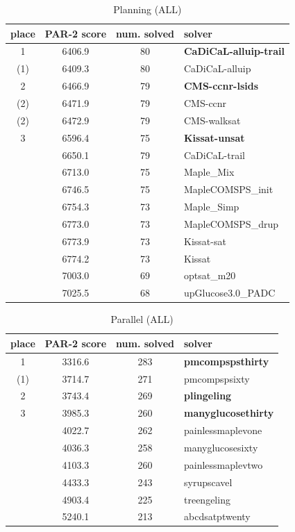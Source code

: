 \documentclass{elsarticle}
\begin{document}
\begin{table}
\caption{Planning (ALL)}
\label{tab:planning}
\begin{tabular}{cccl}
place & PAR-2 score & num. solved & solver \\
\hline   
 1    & 6406.9 & 80 & {\bf CaDiCaL-alluip-trail} \\
(1)   & 6409.3 & 80 & CaDiCaL-alluip \\
 2    & 6466.9 & 79 & {\bf CMS-ccnr-lsids} \\
(2)   & 6471.9 & 79 & CMS-ccnr \\
(2)   & 6472.9 & 79 & CMS-walksat \\
 3    & 6596.4 & 75 & {\bf Kissat-unsat} \\
      & 6650.1 & 79 & CaDiCaL-trail \\
      & 6713.0 & 75 & Maple\_Mix \\
      & 6746.5 & 75 & MapleCOMSPS\_init \\
      & 6754.3 & 73 & Maple\_Simp \\
      & 6773.0 & 73 & MapleCOMSPS\_drup \\
      & 6773.9 & 73 & Kissat-sat \\
      & 6774.2 & 73 & Kissat \\
      & 7003.0 & 69 & optsat\_m20 \\
      & 7025.5 & 68 & upGlucose3.0\_PADC \\
\end{tabular}
\end{table}


\begin{table}
\caption{Parallel (ALL)}
\label{tab:parallelALL}
\begin{tabular}{cccl}
place & PAR-2 score & num. solved & solver \\
\hline
 1 & 3316.6 & 283 & {\bf pmcompspsthirty} \\
(1)& 3714.7 & 271 & pmcompspsixty \\
 2 & 3743.4 & 269 & {\bf plingeling} \\
 3 & 3985.3 & 260 & {\bf manyglucosethirty} \\
   & 4022.7 & 262 & painlessmaplevone \\
   & 4036.3 & 258 & manyglucosesixty \\
   & 4103.3 & 260 & painlessmaplevtwo \\
   & 4433.3 & 243 & syrupscavel \\
   & 4903.4 & 225 & treengeling \\
   & 5240.1 & 213 & abcdsatptwenty \\
\end{tabular}
\end{table}
\end{document}
